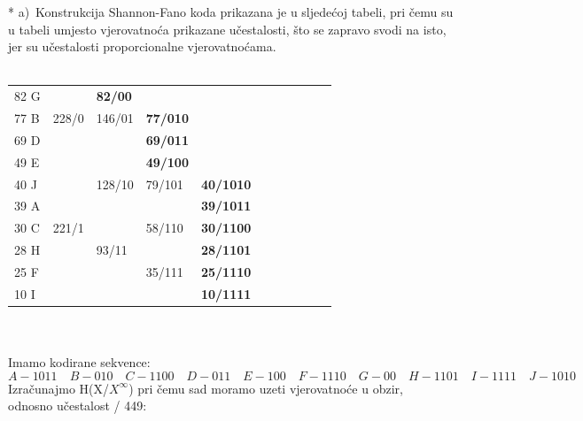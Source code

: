 \documentclass[12pt]{article}
\begin{document}
\begin{enumerate}
		* a)~Konstrukcija Shannon-Fano koda prikazana je u sljedećoj tabeli, pri
čemu su u tabeli umjesto vjerovatnoća prikazane učestalosti, što se
zapravo svodi na isto, jer su učestalosti proporcionalne vjerovatnoćama. \\
\\
\begin{tabular}{|l|l|l|llllllll}
\cline{1-3}
82 G &       & \textbf{82/00} &                                      &                                       &  &  &  &  &  &  \\ \cline{1-1} \cline{3-4}
77 B & 228/0 & 146/01         & \multicolumn{1}{l|}{\textbf{77/010}} &                                       &  &  &  &  &  &  \\ \cline{1-1} \cline{4-4}
69 D &       &                & \multicolumn{1}{l|}{\textbf{69/011}} &                                       &  &  &  &  &  &  \\ \cline{1-4}
49 E &       &                & \multicolumn{1}{l|}{\textbf{49/100}} &                                       &  &  &  &  &  &  \\ \cline{1-1} \cline{4-5}
40 J &       & 128/10         & \multicolumn{1}{l|}{79/101}          & \multicolumn{1}{l|}{\textbf{40/1010}} &  &  &  &  &  &  \\ \cline{1-1} \cline{5-5}
39 A &       &                & \multicolumn{1}{l|}{}                & \multicolumn{1}{l|}{\textbf{39/1011}} &  &  &  &  &  &  \\ \cline{1-1} \cline{3-5}
30 C & 221/1 &                & \multicolumn{1}{l|}{58/110}          & \multicolumn{1}{l|}{\textbf{30/1100}} &  &  &  &  &  &  \\ \cline{1-1} \cline{5-5}
28 H &       & 93/11         & \multicolumn{1}{l|}{}                & \multicolumn{1}{l|}{\textbf{28/1101}} &  &  &  &  &  &  \\ \cline{1-1} \cline{4-5}
25 F &       &                & \multicolumn{1}{l|}{35/111}          & \multicolumn{1}{l|}{\textbf{25/1110}} &  &  &  &  &  &  \\ \cline{1-1} \cline{5-5}
10 I &       &                & \multicolumn{1}{l|}{}                & \multicolumn{1}{l|}{\textbf{10/1111}} &  &  &  &  &  &  \\ \cline{1-5}
\end{tabular}
\\
\\
Imamo kodirane sekvence:
\begin{equation*}
    A - 1011 \quad B - 010 \quad C - 1100 \quad D - 011 \quad E - 100 \quad F - 1110 \quad G - 00 \quad H - 1101 \quad I - 1111 \quad J - 1010
\end{equation*}
Izračunajmo H(X/${X^\infty}$) pri čemu sad moramo uzeti vjerovatnoće u obzir, \\odnosno  učestalost / 449:
		

\end{enumerate}
\end{document}
